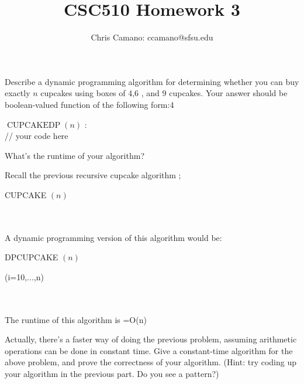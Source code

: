 \documentclass[11pt]{article}
\author{Chris Camano: ccamano@sfsu.edu}
\title{CSC510  Homework 3 }
\date
\theoremstyle{definition}  %
\newcommand{\block}[2]{\begin{tcolorbox}[title={#1}]{#2}\end{tcolorbox}}
\begin{document}
\maketitle
\block{Question #1}{
Describe a dynamic programming algorithm for determining whether you can buy exactly $n$ cupcakes using boxes of 4,6 , and 9 cupcakes. Your answer should be boolean-valued function of the following form:4
\begin{center}
  $\operatorname{CUPCAKEDP}(n)$ :\\
  // your code here
\end{center}
  What's the runtime of your algorithm?
}
Recall the previous recursive cupcake algorithm ;
\begin{algorithm}
    \caption{CUPCAKE $(n)$ }
    \label{alg:algorithm_sum}
    \begin{algorithmic}[1]


      \EndIf


      \Else


    \end{algorithmic}
  \end{algorithm}\\\\
  A dynamic programming version of this algorithm would be:
  \begin{algorithm}
    \caption{DPCUPCAKE $(n)$ }
    \label{alg:algorithm_sum}
    \begin{algorithmic}[1]
      \For(i=10,...,n)
      \EndFor
    \end{algorithmic}
  \end{algorithm}\\\\
  The runtime of this algorithm is =O(n)
  \pagebreak
\block{Question #2}{
Actually, there's a faster way of doing the previous problem, assuming arithmetic operations can be done in constant time. Give a constant-time algorithm for the above problem, and prove the correctness of your algorithm. (Hint: try coding up your algorithm in the previous part. Do you see a pattern?)
}
\end{document}
